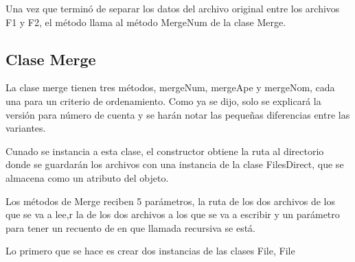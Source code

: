 \documentclass[11pt]{article}
\begin{document}
Una vez que terminó de separar los datos del archivo original entre los archivos F1 y F2, el método llama al método MergeNum de la clase Merge.

\subsection{Clase Merge}
La clase merge tienen tres métodos, mergeNum, mergeApe y mergeNom, cada una para un criterio de ordenamiento. Como ya se dijo, solo se explicará la versión para número de cuenta y se harán notar las pequeñas diferencias entre las variantes.

Cunado se instancia a esta clase, el constructor obtiene la ruta al directorio donde se guardarán los archivos con una instancia de la clase FilesDirect, que se almacena como un atributo del objeto.

Los métodos de Merge reciben 5 parámetros, la ruta de los dos archivos de los que se va a lee,r la de los dos archivos a los que se va a escribir y un parámetro para tener un recuento de en que llamada recursiva se está. 

Lo primero que se hace es crear dos instancias de las clases File, File
\end{document}
